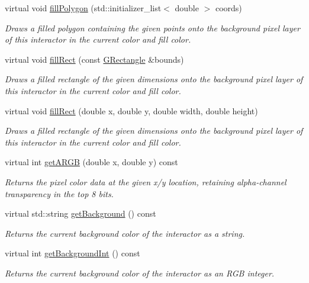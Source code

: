 \begin{DoxyCompactItemize}
virtual void \mbox{\hyperlink{classGDrawingSurface_a15f8c1c4409ef51c1a30a92a195b8f66}{fill\+Polygon}} (std\+::initializer\+\_\+list$<$ double $>$ coords)
\begin{DoxyCompactList}\small\item\em Draws a filled polygon containing the given points onto the background pixel layer of this interactor in the current color and fill color. \end{DoxyCompactList}\item 
virtual void \mbox{\hyperlink{classGDrawingSurface_ae6582295003bf2488836b1993dadbad7}{fill\+Rect}} (const \mbox{\hyperlink{classGRectangle}{G\+Rectangle}} \&bounds)
\begin{DoxyCompactList}\small\item\em Draws a filled rectangle of the given dimensions onto the background pixel layer of this interactor in the current color and fill color. \end{DoxyCompactList}\item 
virtual void \mbox{\hyperlink{classGDrawingSurface_aac3ae7d3aee950de78eca0e108352254}{fill\+Rect}} (double x, double y, double width, double height)
\begin{DoxyCompactList}\small\item\em Draws a filled rectangle of the given dimensions onto the background pixel layer of this interactor in the current color and fill color. \end{DoxyCompactList}\item 
virtual int \mbox{\hyperlink{classGDrawingSurface_ae394d39f20476570e083918d991c25bd}{get\+A\+R\+GB}} (double x, double y) const
\begin{DoxyCompactList}\small\item\em Returns the pixel color data at the given x/y location, retaining alpha-\/channel transparency in the top 8 bits. \end{DoxyCompactList}\item 
virtual std\+::string \mbox{\hyperlink{classGDrawingSurface_a808e22cc1fdfbecf71ed8c64ef4600e0}{get\+Background}} () const
\begin{DoxyCompactList}\small\item\em Returns the current background color of the interactor as a string. \end{DoxyCompactList}\item 
virtual int \mbox{\hyperlink{classGDrawingSurface_a9e827257a55cb8cf4d9de2ec6bcfd7a0}{get\+Background\+Int}} () const
\begin{DoxyCompactList}\small\item\em Returns the current background color of the interactor as an R\+GB integer. \end{DoxyCompactList}\item 

\end{DoxyCompactItemize}
